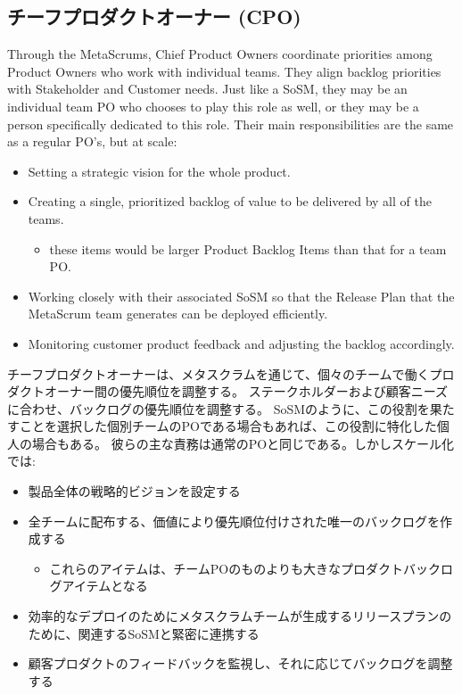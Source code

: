 \documentclass[12pt,a4paper,parskip=full]{scrartcl}
\begin{document}
\subsection{チーフプロダクトオーナー (CPO)}
Through the MetaScrums, Chief Product Owners coordinate priorities among
Product Owners who work with individual teams. They align backlog
priorities with Stakeholder and Customer needs. Just like a SoSM, they may
be an individual team PO who chooses to play this role as well, or they may
be a person specifically dedicated to this role. Their main
responsibilities are the same as a regular PO's, but at scale:
\begin{itemize}
\item Setting a strategic vision for the whole product.
\item Creating a single, prioritized backlog of value to be delivered by
all of the teams.
\begin{itemize}
\item these items would be larger Product Backlog Items than that for a team PO.
\end{itemize}
\item Working closely with their associated SoSM so that the Release Plan
that the MetaScrum team generates can be deployed efficiently.
\item Monitoring customer product feedback and adjusting the backlog
accordingly.
\end{itemize}
\fi
チーフプロダクトオーナーは、メタスクラムを通じて、個々のチームで働くプロダクトオーナー間の優先順位を調整する。
ステークホルダーおよび顧客ニーズに合わせ、バックログの優先順位を調整する。
SoSMのように、この役割を果たすことを選択した個別チームのPOである場合もあれば、この役割に特化した個人の場合もある。
彼らの主な責務は通常のPOと同じである。しかしスケール化では:
\begin{itemize}
\item 製品全体の戦略的ビジョンを設定する
\item 全チームに配布する、価値により優先順位付けされた唯一のバックログを作成する
\begin{itemize}
\item これらのアイテムは、チームPOのものよりも大きなプロダクトバックログアイテムとなる
\end{itemize}
\item 効率的なデプロイのためにメタスクラムチームが生成するリリースプランのために、関連するSoSMと緊密に連携する
\item 顧客プロダクトのフィードバックを監視し、それに応じてバックログを調整する
\end{itemize}
\end{document}
